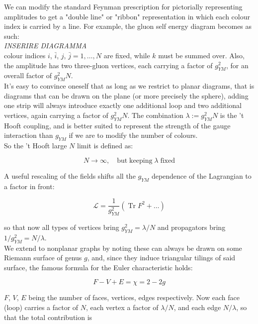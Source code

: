 \documentclass[11pt,a4paper,twoside,openright]{book}
\DeclareMathOperator{\Tr}{Tr}
\begin{document}
We can modify the standard Feynman prescription for pictorially representing amplitudes to get a "double line" or "ribbon" representation in which each colour index is carried by a line. For example, the gluon self energy diagram becomes as such:\\

\emph{INSERIRE DIAGRAMMA}\\

colour indices $i$, $\bar i$, $j$, $\bar j = 1 , \ldots , N$ are fixed, while $k$ must be summed over. Also, the amplitude has two three-gluon vertices, each carrying a factor of $g_{YM}^2$, for an overall factor of $g_{YM}^2 N$.\\

It's easy to convince oneself that as long as we restrict to planar diagrams, that is diagrams that can be drawn on the plane (or more precisely the sphere), adding one strip will always introduce exactly one additional loop and two additional vertices, again carrying a factor of $g_{YM}^2 N$. The combination $\lambda := g_{YM}^2 N$ is the 't Hooft coupling, and is better suited to represent the strength of the gauge interaction than $g_{YM}$ if we are to modify the number of colours.\\

So the 't Hooft large $N$ limit is defined as:

\begin{equation}
N \rightarrow \infty, \quad \mathrm{but \; keeping } \; \lambda \; \mathrm{fixed}
\end{equation}

A useful rescaling of the fields shifts all the $g_{YM}$ dependence of the Lagrangian to a factor in front:

\begin{equation} \label{rescaling} \mathcal{L} = \frac{1}{g_{YM}^2} \left( \Tr F^2 + \ldots \right) \end{equation}

so that now all types of vertices bring $g_{YM}^2 = \lambda/N$ and propagators bring $1/g_{YM}^2 = N/\lambda$.\\

We extend to nonplanar graphs by noting these can always be drawn on some Riemann surface of genus $g$, and, since they induce triangular tilings of said surface, the famous formula for the Euler characteristic holds:

\[ F - V + E = \chi = 2 - 2g \]

$F$, $V$, $E$ being the number of faces, vertices, edges respectively. Now each face (loop) carries a factor of $N$, each vertex a factor of $\lambda/N$, and each edge $N/\lambda$, so that the total contribution is
\end{document}
